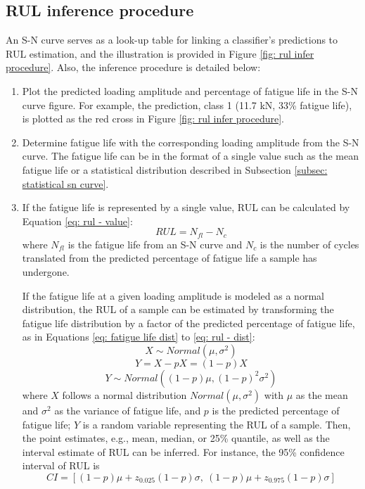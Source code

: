 \subsection{RUL inference procedure}
An S-N curve serves as a look-up table for linking a classifier's predictions to RUL estimation, and the illustration is provided in Figure \ref{fig: rul infer procedure}. Also, the inference procedure is detailed below:
\begin{enumerate}
    \item Plot the predicted loading amplitude and percentage of fatigue life in the S-N curve figure. For example, the prediction, class 1 (11.7 kN, 33\% fatigue life), is plotted as the red cross in Figure \ref{fig: rul infer procedure}.
    \item Determine fatigue life with the corresponding loading amplitude from the S-N curve. The fatigue life can be in the format of a single value such as the mean fatigue life or a statistical distribution described in Subsection \ref{subsec: statistical sn curve}.
    \item If the fatigue life is represented by a single value, RUL can be calculated by Equation \eqref{eq: rul - value}: 
    \begin{equation}
        \label{eq: rul - value}
        RUL = N_{fl} - N_{c}
    \end{equation}
    where $N_{fl}$ is the fatigue life from an S-N curve and $N_c$ is the number of cycles translated from the predicted percentage of fatigue life a sample has undergone.

    If the fatigue life at a given loading amplitude is modeled as a normal distribution, the RUL of a sample can be estimated by transforming the fatigue life distribution by a factor of the predicted percentage of fatigue life, as in Equations \eqref{eq: fatigue life dist} to \eqref{eq: rul - dist}:
    \begin{equation}
        \label{eq: fatigue life dist}
        X \sim Normal(\mu, \sigma^2)
    \end{equation}
    \begin{equation}
        \label{eq: rul transform}
        Y = X - pX = (1 - p)X
    \end{equation}
    \begin{equation}
        \label{eq: rul - dist}
        Y \sim Normal((1-p)\mu, (1-p)^2\sigma^2)
    \end{equation}
    where $X$ follows a normal distribution $Normal (\mu, \sigma^2)$ with $\mu$ as the mean and $\sigma^2$ as the variance of fatigue life, and $p$ is the predicted percentage of fatigue life; $Y$ is a random variable representing the RUL of a sample. Then, the point estimates, e.g., mean, median, or 25\% quantile, as well as the interval estimate of RUL can be inferred. For instance, the 95\% confidence interval of RUL is
    \begin{equation}
        CI = [(1-p)\mu + z_{0.025} (1-p) \sigma,\ (1-p)\mu + z_{0.975} (1-p) \sigma]
    \end{equation}
\end{enumerate}


